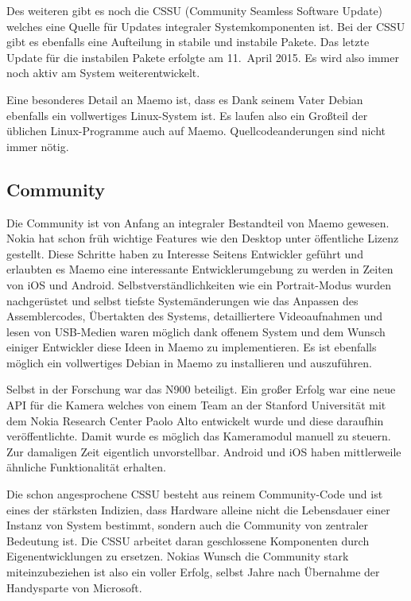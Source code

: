 Des weiteren gibt es noch die CSSU\thinspace\cite{online:maemo-cssu} (Community Seamless Software Update) welches eine Quelle für Updates integraler Systemkomponenten ist. Bei der CSSU gibt es ebenfalls eine Aufteilung in stabile und instabile Pakete. Das letzte Update für die instabilen Pakete erfolgte am 11.\ April 2015\thinspace\cite{online:maemo-cssuchangelog}. Es wird also immer noch aktiv am System weiterentwickelt.

Eine besonderes Detail an Maemo ist, dass es Dank seinem Vater Debian ebenfalls ein vollwertiges Linux-System ist. Es laufen also ein Großteil der üblichen Linux-Programme auch auf Maemo. Quellcodeanderungen sind nicht immer nötig.\\ 

\subsection{Community}
Die Community ist von Anfang an integraler Bestandteil von Maemo gewesen. Nokia hat schon früh wichtige Features wie den Desktop unter öffentliche Lizenz gestellt\thinspace\cite{online:maemo-hildon}. Diese Schritte haben zu Interesse Seitens Entwickler geführt und erlaubten es Maemo eine interessante Entwicklerumgebung zu werden in Zeiten von iOS und Android. Selbstverständlichkeiten wie ein Portrait-Modus wurden nachgerüstet\thinspace\cite{online:maemo-portrait} und selbst tiefste Systemänderungen wie das Anpassen des Assemblercodes\thinspace\cite{online:maemo-thumb}, Übertakten des Systems\thinspace\cite{online:maemo-overclocking}, detailliertere Videoaufnahmen\thinspace\cite{online:maemo-hdvideo} und lesen von USB-Medien\thinspace\cite{online:maemo-usbhost}  waren möglich dank offenem System und dem Wunsch einiger Entwickler diese Ideen in Maemo zu implementieren. Es ist ebenfalls möglich ein vollwertiges Debian in Maemo zu installieren und auszuführen\thinspace\cite{online:maemo-easydebian}\thinspace\cite{online:maemo-easydebianwiki}.

Selbst in der Forschung war das N900 beteiligt. Ein großer Erfolg war eine neue API für die Kamera welches von einem Team an der Stanford Universität mit dem Nokia Research Center Paolo Alto entwickelt wurde und diese daraufhin veröffentlichte\thinspace\cite{online:maemo-fcam}. Damit wurde es möglich das Kameramodul manuell zu steuern. Zur damaligen Zeit eigentlich unvorstellbar. Android und iOS haben mittlerweile ähnliche Funktionalität erhalten\thinspace\cite{online:maemo-fcamlegacy}.

Die schon angesprochene CSSU besteht aus reinem Community-Code und ist eines der stärksten Indizien, dass Hardware alleine nicht die Lebensdauer einer Instanz von System bestimmt, sondern auch die Community von zentraler Bedeutung ist. Die CSSU arbeitet daran geschlossene Komponenten durch Eigenentwicklungen zu ersetzen. Nokias Wunsch die Community stark miteinzubeziehen ist also ein voller Erfolg, selbst Jahre nach Übernahme der Handysparte von Microsoft\thinspace\cite{online:nokia-microsoft}.\\

